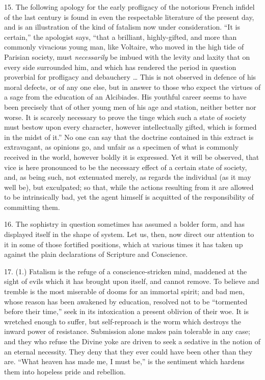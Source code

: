 15. The following apology for the early profligacy of the notorious
French infidel of the last century is found in even the respectable
literature of the present day, and is an illustration of the kind of
fatalism now under consideration. ``It is certain,'' the
apologist says, ``that a brilliant, highly-gifted, and more than
commonly vivacious young man, like Voltaire, who moved in the high
tide of Parisian society, must \emph{necessarily} be imbued with the
levity and laxity that on every side surrounded him, and which has
rendered the period in question proverbial for profligacy and
debauchery … This is not observed in defence of his moral defects,
or of any one else, but in answer to those who expect the virtues of a
sage from the education of an Alcibiades. His youthful career seems to
have been precisely that of other young men of his age and station,
neither better nor worse. It is scarcely necessary to prove the tinge
which such a state of society must bestow upon every character,
however intellectually gifted, which is formed in the midst of
it.'' No one can say that the doctrine contained in this extract
is extravagant, as opinions go, and unfair as a specimen of what is
commonly received in the world, however boldly it is expressed. Yet it
will be observed, that vice is here pronounced to be the necessary
effect of a certain state of society, and, as being such, not
extenuated merely, as regards the individual (as it may well be), but
exculpated; so that, while the actions resulting from it are allowed
to be intrinsically bad, yet the agent himself is acquitted of the
responsibility of committing them.

16. The sophistry in question sometimes has assumed a bolder form,
and has displayed itself in the shape of system. Let us, then, now
direct our attention to it in some of those fortified positions, which
at various times it has taken up against the plain declarations of
Scripture and Conscience.

17. (1.) Fatalism is the refuge of a conscience-stricken mind,
maddened at the sight of evils which it has brought upon itself, and
cannot remove. To believe and tremble is the most miserable of dooms
for an immortal spirit; and bad men, whose reason has been awakened by
education, resolved not to be ``tormented before their time,''
seek in its intoxication a present oblivion of their woe. It is
wretched enough to suffer, but self-reproach is the worm which
destroys the inward power of resistance. Submission alone makes pain
tolerable in any case; and they who refuse the Divine yoke are driven
to seek a sedative in the notion of an eternal necessity. They deny
that they ever could have been other than they are. ``What heaven
has made me, I must be,'' is the sentiment which hardens them into
hopeless pride and rebellion.

